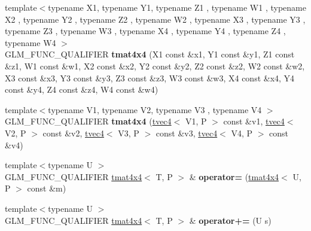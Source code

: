\begin{DoxyCompactItemize}
\item 
{\footnotesize template$<$typename X1, typename Y1, typename Z1 , typename W1 , typename X2 , typename Y2 , typename Z2 , typename W2 , typename X3 , typename Y3 , typename Z3 , typename W3 , typename X4 , typename Y4 , typename Z4 , typename W4 $>$ }\\G\+L\+M\+\_\+\+F\+U\+N\+C\+\_\+\+Q\+U\+A\+L\+I\+F\+I\+ER {\bfseries tmat4x4} (X1 const \&x1, Y1 const \&y1, Z1 const \&z1, W1 const \&w1, X2 const \&x2, Y2 const \&y2, Z2 const \&z2, W2 const \&w2, X3 const \&x3, Y3 const \&y3, Z3 const \&z3, W3 const \&w3, X4 const \&x4, Y4 const \&y4, Z4 const \&z4, W4 const \&w4)\hypertarget{structglm_1_1detail_1_1tmat4x4_a4ff165b66bf5ce7b3a56f17727741389}{}\label{structglm_1_1detail_1_1tmat4x4_a4ff165b66bf5ce7b3a56f17727741389}

\item 
{\footnotesize template$<$typename V1, typename V2, typename V3 , typename V4 $>$ }\\G\+L\+M\+\_\+\+F\+U\+N\+C\+\_\+\+Q\+U\+A\+L\+I\+F\+I\+ER {\bfseries tmat4x4} (\hyperlink{structglm_1_1detail_1_1tvec4}{tvec4}$<$ V1, P $>$ const \&v1, \hyperlink{structglm_1_1detail_1_1tvec4}{tvec4}$<$ V2, P $>$ const \&v2, \hyperlink{structglm_1_1detail_1_1tvec4}{tvec4}$<$ V3, P $>$ const \&v3, \hyperlink{structglm_1_1detail_1_1tvec4}{tvec4}$<$ V4, P $>$ const \&v4)\hypertarget{structglm_1_1detail_1_1tmat4x4_ad7a7e2dc47a7bd42e43ddf68efbab34f}{}\label{structglm_1_1detail_1_1tmat4x4_ad7a7e2dc47a7bd42e43ddf68efbab34f}

\item 
{\footnotesize template$<$typename U $>$ }\\G\+L\+M\+\_\+\+F\+U\+N\+C\+\_\+\+Q\+U\+A\+L\+I\+F\+I\+ER \hyperlink{structglm_1_1detail_1_1tmat4x4}{tmat4x4}$<$ T, P $>$ \& {\bfseries operator=} (\hyperlink{structglm_1_1detail_1_1tmat4x4}{tmat4x4}$<$ U, P $>$ const \&m)\hypertarget{structglm_1_1detail_1_1tmat4x4_a7afed31f7061ff2a5146b9f0c50a8542}{}\label{structglm_1_1detail_1_1tmat4x4_a7afed31f7061ff2a5146b9f0c50a8542}

\item 
{\footnotesize template$<$typename U $>$ }\\G\+L\+M\+\_\+\+F\+U\+N\+C\+\_\+\+Q\+U\+A\+L\+I\+F\+I\+ER \hyperlink{structglm_1_1detail_1_1tmat4x4}{tmat4x4}$<$ T, P $>$ \& {\bfseries operator+=} (U s)\hypertarget{structglm_1_1detail_1_1tmat4x4_a6da15355273fb3d106d71e9f97fa5654}{}\label{structglm_1_1detail_1_1tmat4x4_a6da15355273fb3d106d71e9f97fa5654}


\end{DoxyCompactItemize}
